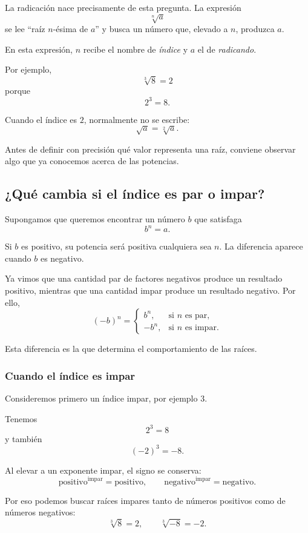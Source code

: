 La radicación nace precisamente de esta pregunta. La expresión
\[
\sqrt[n]{a}
\]
se lee ``raíz \(n\)-ésima de \(a\)'' y busca un número que, elevado a \(n\), produzca \(a\).

En esta expresión, \(n\) recibe el nombre de \emph{índice} y \(a\) el de \emph{radicando}.

Por ejemplo,
\[
\sqrt[3]{8}=2
\]
porque
\[
2^3=8.
\]

Cuando el índice es \(2\), normalmente no se escribe:
\[
\sqrt a=\sqrt[2]{a}.
\]

Antes de definir con precisión qué valor representa una raíz, conviene observar algo que ya conocemos acerca de las potencias.

\subsection{¿Qué cambia si el índice es par o impar?}

Supongamos que queremos encontrar un número \(b\) que satisfaga
\[
b^n=a.
\]

Si \(b\) es positivo, su potencia será positiva cualquiera sea \(n\). La diferencia aparece cuando \(b\) es negativo.

Ya vimos que una cantidad par de factores negativos produce un resultado positivo, mientras que una cantidad impar produce un resultado negativo. Por ello,
\[
(-b)^n=
\begin{cases}
b^n, & \text{si \(n\) es par},\\
-b^n, & \text{si \(n\) es impar}.
\end{cases}
\]

Esta diferencia es la que determina el comportamiento de las raíces.

\subsubsection{Cuando el índice es impar}

Consideremos primero un índice impar, por ejemplo \(3\).

Tenemos
\[
2^3=8
\]
y también
\[
(-2)^3=-8.
\]

Al elevar a un exponente impar, el signo se conserva:
\[
\text{positivo}^{\text{impar}}=\text{positivo},
\qquad
\text{negativo}^{\text{impar}}=\text{negativo}.
\]

Por eso podemos buscar raíces impares tanto de números positivos como de números negativos:
\[
\sqrt[3]{8}=2,
\qquad
\sqrt[3]{-8}=-2.
\]

